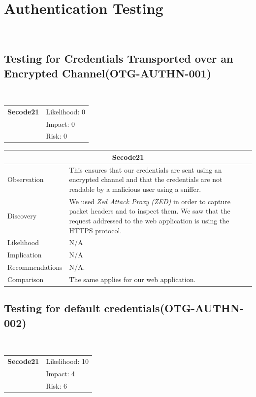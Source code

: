 \documentclass[headsepline,footsepline,footinclude=false,oneside,fontsize=11pt,paper=a4,listof=totoc,bibliography=totoc]{scrbook} %
\begin{document}
\section{Authentication Testing}\
\subsection{Testing for Credentials Transported over an Encrypted Channel(OTG-AUTHN-001)}\

\begin{tabular}{cR{12cm}}
	\textbf{Secode21} & Likelihood: 0\\& Impact: 0\\& Risk: 0
\end{tabular}

\begin{tabular}{ l|p{11cm}  }
	\hline
	\multicolumn{2}{c}{\textbf{Secode21}} \\
	\hline
	Observation   & This ensures that our credentials are sent using an encrypted channel and that the credentials are not readable by a malicious user using a sniffer. \\
	Discovery  &  We used \textit{Zed Attack Proxy (ZED)} in order to capture packet headers and to inspect them.  We saw that the request addressed to the web application is  using the HTTPS protocol.\\
	Likelihood & N/A \\
	Implication    & N/A \\
	Recommendations & N/A. \\
	Comparison & The same applies for our web application.\\
	\hline
\end{tabular}

\pagebreak
\subsection{Testing for default credentials(OTG-AUTHN-002)}\
\begin{tabular}{cR{12cm}}
	\textbf{Secode21} & Likelihood: 10\\& Impact: 4\\& Risk: 6
\end{tabular}
\end{document}
